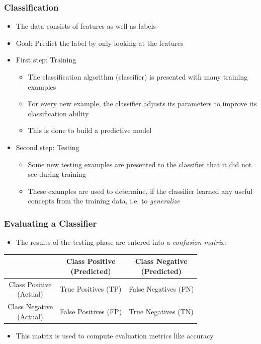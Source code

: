 \begin{frame}
  \frametitle{Classification}
  \begin{itemize}
    \item The data consists of features as well as labels
    \item Goal: Predict the label by only looking at the features
    \item First step: Training
      \begin{itemize}
        \item The classification algorithm (classifier) is presented
          with many training examples
        \item For every new example, the classifier adjusts its
          parameters to improve its classification ability
        \item This is done to build a predictive model
      \end{itemize}
    \item Second step: Testing
      \begin{itemize}
        \item Some new testing examples are presented to the
          classifier that it did not see during training
        \item These examples are used to determine, if the classifier
          learned any useful concepts from the training data, i.e. to
          \textit{generalize}
      \end{itemize}
  \end{itemize}
\end{frame}

\begin{frame}
  \frametitle{Evaluating a Classifier}
  \begin{itemize}
    \item The results of the testing phase are entered into a
      \textit{confusion matrix:}
  \end{itemize}
  \begin{table}[h]
  \centering
  \renewcommand\theadfont{\bfseries}
  \begin{tabular}{|c|c|c|}
    \hline
    & \thead{Class Positive\\(Predicted)} & \thead{Class Negative\\(Predicted)} \\
    \hline
    \thead{Class Positive\\(Actual)} & True Positives (TP) & False
    Negatives (FN) \\
    \hline
    \thead{Class Negative\\(Actual)} & False Positives (FP) & True
    Negatives (TN) \\
    \hline
  \end{tabular}
  \end{table}
  \begin{itemize}
    \item This matrix is used to compute evaluation metrics like accuracy
  \end{itemize}
\end{frame}

